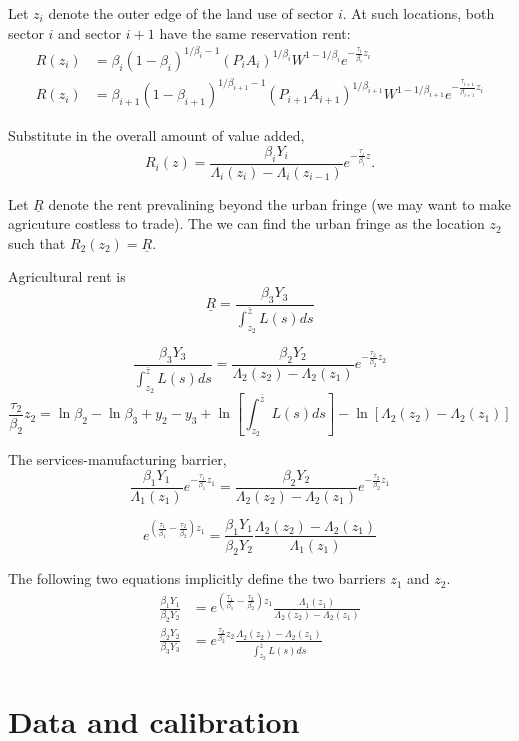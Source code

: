 \documentclass[12pt]{article}
\begin{document}
Let $z_i$ denote the outer edge of the land use of sector $i$. At such locations, both sector $i$ and sector $i+1$ have the same reservation rent: 
\begin{align*}
R(z_i) &=\beta_i(1-\beta_i)^{1/\beta_i-1} (P_iA_i)^{1/\beta_i} W^{1-1/\beta_i} e^{-\frac{\tau_i}{\beta_i} z_i}\\
R(z_i) &=\beta_{i+1}(1-\beta_{i+1})^{1/\beta_{i+1}-1} (P_{i+1}A_{i+1})^{1/\beta_{i+1}} W^{1-1/\beta_{i+1}} e^{-\frac{\tau_{i+1}}{\beta_{i+1}} z_i}
\end{align*}

Substitute in the overall amount of value added,
\[
R_i(z) = \frac{\beta_i Y_i}{\Lambda_i(z_i)-\Lambda_i(z_{i-1})} e^{-\frac{\tau_{i}}{\beta_{i}} z}.
\]


Let $\underline R$ denote the rent prevalining beyond the urban fringe (we may want to make agricuture costless to trade). The we can find the urban fringe as the location $z_2$ such that $R_2(z_2)=\underline R$.

Agricultural rent is
\[
\underline R = \frac{\beta_3 Y_3}{\int_{z_2}^{\bar z}L(s)ds} 
\]

\[
 \frac{\beta_3 Y_3}{\int_{z_2}^{\bar z}L(s)ds} =
 \frac{\beta_2 Y_2}{\Lambda_2(z_2)-\Lambda_2(z_1)} e^{-\frac{\tau_{2}}{\beta_{2}} z_2}
\]
\[
\frac{\tau_2}{\beta_2}z_2 =
\ln\beta_2-\ln\beta_3 +y_2-y_3+\ln\left[\int_{z_2}^{\bar z}L(s)ds\right]
-\ln[\Lambda_2(z_2)-\Lambda_2(z_1)]
\]

The services-manufacturing barrier,
\[
 \frac{\beta_1 Y_1}{\Lambda_1(z_1)} e^{-\frac{\tau_{1}}{\beta_{1}} z_1} =
 \frac{\beta_2 Y_2}{\Lambda_2(z_2)-\Lambda_2(z_1)} e^{-\frac{\tau_{2}}{\beta_{2}} z_1}
\]

\[
e^{\left(\frac{\tau_{1}}{\beta_{1}}-\frac{\tau_{2}}{\beta_{2}}\right) z_1}
= 
 \frac{\beta_1 Y_1}{\beta_2 Y_2}  
 \frac{\Lambda_2(z_2)-\Lambda_2(z_1)}{\Lambda_1(z_1)} 
\]

The following two equations implicitly define the two barriers $z_1$ and $z_2$.
\begin{align}
 \frac{\beta_1 Y_1}{\beta_2 Y_2}  
 &=
 e^{\left(\frac{\tau_{1}}{\beta_{1}}-\frac{\tau_{2}}{\beta_{2}}\right) z_1}
 \frac{\Lambda_1(z_1)}{\Lambda_2(z_2)-\Lambda_2(z_1)} 
\\
 \frac{\beta_2 Y_2}  {\beta_3 Y_3}
 &=
 e^{\frac{\tau_{2}}{\beta_{2}} z_2}
 \frac{\Lambda_2(z_2)-\Lambda_2(z_1)} {\int_{z_2}^{\bar z}L(s)ds}
\end{align}


\section{Data and calibration}
\end{document}
